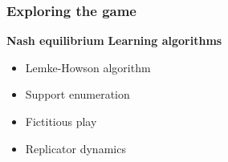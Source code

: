 \begin{frame}
    \frametitle{Exploring the game}
    
    \large
    \textbf{Nash equilibrium}
    \hspace{2cm}
    \textbf{Learning algorithms}

    \normalsize
    \vspace{0.5cm}
    \begin{multicols}{2}
        \begin{itemize}
            \item Lemke-Howson algorithm
            \vspace{0.5cm}
            \item Support enumeration

            \item Fictitious play
            \vspace{0.5cm}
            \item Replicator dynamics
        \end{itemize}
    \end{multicols}
\end{frame}